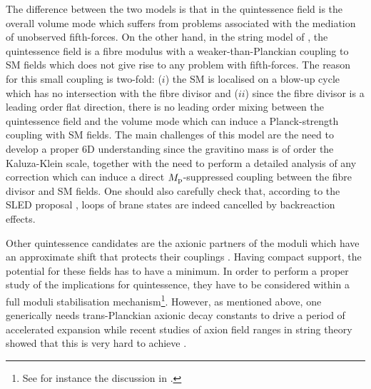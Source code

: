\documentclass[11pt,a4paper]{article}
\begin{document}
\begin{itemize}
The difference between the two models is that in \cite{Albrecht:2001xt} the quintessence field is the overall volume mode which suffers from problems associated with the mediation of unobserved fifth-forces. On the other hand, in the string model of \cite{Cicoli:2012tz}, the quintessence field is a fibre modulus with a weaker-than-Planckian coupling to SM fields which does not give rise to any problem with fifth-forces. The reason for this small coupling is two-fold: ($i$) the SM is localised on a blow-up cycle which has no intersection with the fibre divisor and ($ii$) since the fibre divisor is a leading order flat direction, there is no leading order mixing between the quintessence field and the volume mode which can induce a Planck-strength coupling with SM fields. The main challenges of this model are the need to develop a proper 6D understanding since the gravitino mass is of order the Kaluza-Klein scale, together with the need to perform a detailed analysis of any correction which can induce a direct $M_{\rm p}$-suppressed coupling between the fibre divisor and SM fields. One should also carefully check that, according to the SLED proposal \cite{Aghababaie:2003wz}, loops of brane states are indeed cancelled by backreaction effects. 

Other quintessence candidates are the axionic partners of the moduli which have an approximate shift that protects their couplings \cite{Kaloper:2008qs,Panda:2010uq, Choi:1999xn}. Having compact support, the potential for these fields has to have a minimum. In order to perform a proper study of the implications for quintessence, they have to be considered within a full moduli stabilisation mechanism\footnote{See for instance the discussion in \cite{Panda:2010uq}.}. However, as mentioned above, one generically needs trans-Planckian axionic decay constants to drive a period of accelerated expansion \cite{Freese:1990rb} while recent studies of axion field ranges in string theory showed that this is very hard to achieve \cite{Klaewer:2016kiy, Blumenhagen:2017cxt, Palti:2017elp, Cicoli:2018tcq, Grimm:2018ohb, Heidenreich:2018kpg}.
 

\end{itemize}
\end{document}
